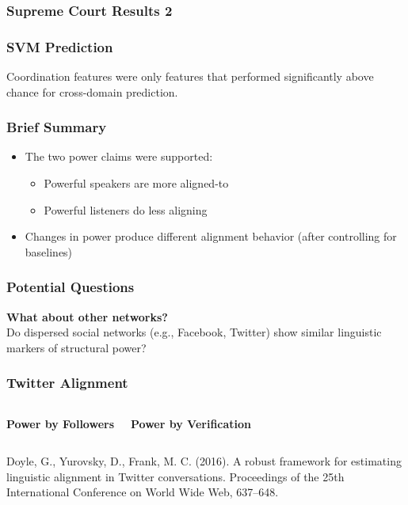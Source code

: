 \documentclass{beamer}
\begin{document}
\begin{frame}
\frametitle{Supreme Court Results 2}
\begin{figure}
\end{figure}
\end{frame}
\begin{frame}
\frametitle{SVM Prediction}
\begin{figure}
\end{figure}
Coordination features were only features that performed significantly above chance for cross-domain prediction. 
\end{frame}
\begin{frame}
\frametitle{Brief Summary}
\begin{itemize}
	\item The two power claims were supported:
	\begin{itemize}
		\item Powerful speakers are more aligned-to
		\item Powerful listeners do less aligning 
	\end{itemize}
	\item Changes in power produce different alignment behavior (after controlling for baselines)
\end{itemize}
\end{frame}
\begin{frame}
\frametitle{Potential Questions}
\textbf{What about other networks?}\\
Do dispersed social networks (e.g., Facebook, Twitter) show similar linguistic markers of structural power?
\end{frame}
\begin{frame}
\frametitle{Twitter Alignment}
\begin{columns}[c]
\textbf{Power by Followers}

\textbf{Power by Verification}

\end{columns}
\vspace{12mm}
\footnotesize{Doyle, G., Yurovsky, D., Frank, M. C. (2016). A robust framework for estimating linguistic alignment in Twitter conversations. Proceedings of the 25th International Conference on World Wide Web, 637–648.} 
\end{frame}
\end{document}
